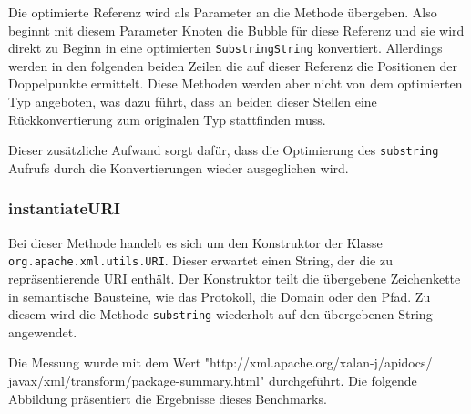 Die optimierte Referenz wird als Parameter an die Methode übergeben. Also beginnt mit diesem 
Parameter Knoten die Bubble für diese Referenz und sie wird direkt zu Beginn in eine
optimierten \texttt{SubstringString} konvertiert. Allerdings werden in den folgenden beiden 
Zeilen die auf dieser Referenz die Positionen der Doppelpunkte ermittelt. Diese Methoden
werden aber nicht von dem optimierten Typ angeboten, was dazu führt, dass an beiden dieser 
Stellen eine Rückkonvertierung zum originalen Typ stattfinden muss. 

Dieser zusätzliche Aufwand sorgt dafür, dass die Optimierung des \texttt{substring} Aufrufs
durch die Konvertierungen wieder ausgeglichen wird. 

\subsubsection{instantiateURI}

Bei dieser Methode handelt es sich um den Konstruktor der Klasse\\ \texttt{org.apache.xml.utils.URI}.
Dieser erwartet einen String, der die zu repräsentierende URI enthält. Der Konstruktor teilt
die übergebene Zeichenkette in semantische Bausteine, wie das Protokoll, die Domain oder den Pfad.
Zu diesem wird die Methode \texttt{substring} wiederholt auf den übergebenen String angewendet. 

Die Messung wurde mit dem Wert "http://xml.apache.org/xalan-j/apidocs/
javax/xml/transform/package-summary.html" durchgeführt. Die folgende Abbildung präsentiert 
die Ergebnisse dieses Benchmarks.


